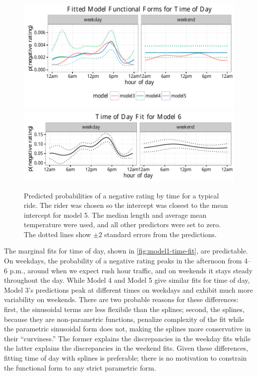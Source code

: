 \documentclass[]{article}
\begin{document}
\begin{figure}[htb]
\centering
\includegraphics{figure/time_fit_plot.pdf}
\includegraphics{figure/time_fit_plot_6.pdf}
\caption{Predicted probabilities of a negative rating by time for a typical ride.
The rider was chosen so the intercept was closest to the mean intercept for model
5. The median length and average mean temperature were used, and all other
predictors were set to zero. The dotted lines show $\pm 2$ standard errors from
the predictions.}
\end{figure}

The marginal fits for time of day, shown in
\autoref{fig:model1-time-fit}, are predictable. On weekdays, the
probability of a negative rating peaks in the afternoon from 4--6 p.m.,
around when we expect rush hour traffic, and on weekends it stays steady
throughout the day. While Model 4 and Model 5 give similar fits for time
of day, Model 3's predictions peak at different times on weekdays and
exhibit much more variability on weekends. There are two probable
reasons for these differences: first, the sinusoidal terms are less
flexibile than the splines; second, the splines, because they are
non-parametric functions, penalize complexity of the fit while the
parametric sinusoidal form does not, making the splines more
conservative in their ``curviness.'' The former explains the
discrepancies in the weekday fits while the latter explains the
discrepancies in the weekend fits. Given these differences, fitting time
of day with splines is preferable; there is no motivation to constrain
the functional form to any strict parametric form.
\end{document}
